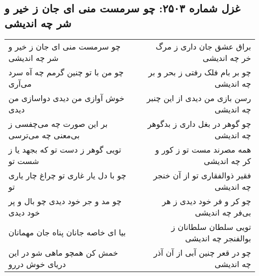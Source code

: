 \begin{center}
\section*{غزل شماره ۲۵۰۳: چو سرمست منی ای جان ز خیر و شر چه اندیشی}
\label{sec:2503}
\begin{longtable}{l p{0.5cm} r}
چو سرمست منی ای جان ز خیر و شر چه اندیشی
&&
براق عشق جان داری ز مرگ خر چه اندیشی
\\
چو من با تو چنین گرمم چه آه سرد می‌آری
&&
چو بر بام فلک رفتی ز بحر و بر چه اندیشی
\\
خوش آوازی من دیدی دواسازی من دیدی
&&
رسن بازی من دیدی از این چنبر چه اندیشی
\\
بر این صورت چه می‌چفسی ز بی‌معنی چه می‌ترسی
&&
چو گوهر در بغل داری ز بدگوهر چه اندیشی
\\
تویی گوهر ز دست تو که بجهد یا ز شست تو
&&
همه مصرند مست تو ز کور و کر چه اندیشی
\\
چو با دل یار غاری تو چراغ چار یاری تو
&&
فقیر ذوالفقاری تو از آن خنجر چه اندیشی
\\
چو مد و جر خود دیدی چو بال و پر خود دیدی
&&
چو کر و فر خود دیدی ز هر بی‌فر چه اندیشی
\\
بیا ای خاصه جانان پناه جان مهمانان
&&
تویی سلطان سلطانان ز بوالفنجر چه اندیشی
\\
خمش کن همچو ماهی شو در این دریای خوش دررو
&&
چو در قعر چنین آبی از آن آذر چه اندیشی
\\
\end{longtable}
\end{center}
